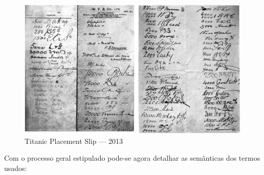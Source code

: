             \begin{figure}[H]
                \centering
                \includegraphics[width=\textwidth]{imgs/Titanic-Placement-Slip1.png}
                    \caption{Titanic Placement Slip — 2013}\label{fig:titanic-placement-slip}
            \end{figure}


        

            Com o processo geral estipulado pode-se agora detalhar as semânticas dos termos usados:

